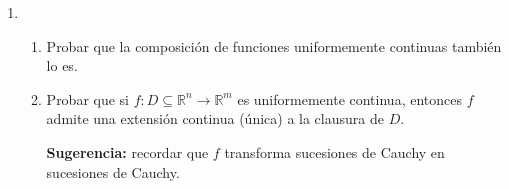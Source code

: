 \documentclass[11pt]{article}
\newcommand{\R}{\mathbb{R}}
\begin{document}
\begin{enumerate}
\item \begin{enumerate}

 
     \item Probar que la composici\'on de funciones uniformemente 
           continuas tambi\'en lo es.
     \item Probar que si $f:D\subseteq\R^n\to\R^m$ es
           uniformemente 
           continua, entonces $f$ admite una extensi\'on continua
           (\'unica) a la clausura de $D$. 
           
           {\bf Sugerencia:} recordar que $f$ transforma
           sucesiones de Cauchy en sucesiones de Cauchy.
      \end{enumerate}
        

        
\end{enumerate}
\end{document}
